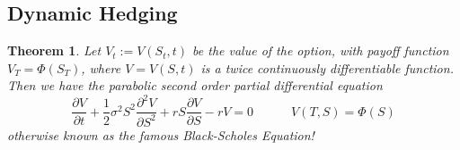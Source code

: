 \documentclass[12pt]{article}
\newtheorem{theorem}{Theorem}
\theoremstyle{definition}
\theoremstyle{remark}
\begin{document}
\subsection{Dynamic Hedging}
\begin{theorem}
	Let $V_t := V(S_t,t)$ be the value of the option, with payoff function $V_T = \Phi(S_T)$, where $V = V(S,t)$ is a twice continuously differentiable function. Then we have the parabolic second order partial differential equation
	\begin{equation}
	\label{eq:BS PDE}
	\frac{\partial V}{\partial t} + \frac{1}{2} \sigma^{2} S^{2} \frac{\partial^{2}V}{\partial S^{2}} + rS \frac{\partial V}{\partial S} - rV = 0 \qquad\quad V(T,S) = \Phi(S)
	\end{equation}
	otherwise known as the famous Black-Scholes Equation!
\end{theorem}
\end{document}

